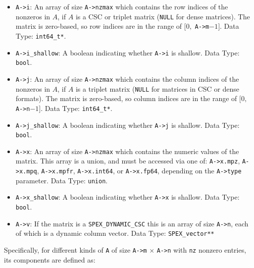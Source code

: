 \documentclass[12pt]{report}
\theoremstyle{definition}
\begin{document}
\begin{itemize}
\item \verb|A->i|: An array of size \verb|A->nzmax| which contains the row
indices of the nonzeros in $A$, if $A$ is a CSC or triplet matrix (\verb|NULL|
for dense matrices). The matrix is zero-based, so row indices are
in the range of $[0,$ \verb|A->m|$-1]$. Data Type: \verb|int64_t*|.

\item \verb|A->i_shallow|: A boolean indicating whether \verb|A->i| is shallow.
Data Type: \verb|bool|.

\item \verb|A->j|: An array of size \verb|A->nzmax| which contains the column
indices of the nonzeros in $A$, if $A$ is a triplet matrix (\verb|NULL| for
matrices in CSC or dense formats).
The matrix is zero-based, so column indices are
in the range of $[0,$ \verb|A->n|$-1]$. Data Type: \verb|int64_t*|.

\item \verb|A->j_shallow|: A boolean indicating whether \verb|A->j| is shallow.
Data Type: \verb|bool|.

\item \verb|A->x|: An array of size \verb|A->nzmax| which contains the
numeric values of the matrix.  This array is a union, and must be accessed via
one of: \verb|A->x.mpz|, \verb|A->x.mpq|, \verb|A->x.mpfr|, \verb|A->x.int64|,
or \verb|A->x.fp64|, depending on the \verb|A->type| parameter.
Data Type: \verb|union|.

\item \verb|A->x_shallow|: A boolean indicating whether \verb|A->x| is
shallow. Data Type: \verb|bool|.

\item \verb|A->v|: If the matrix is a \verb|SPEX_DYNAMIC_CSC| this is an array of size \verb|A->n|, each of which is a dynamic column vector. Data Type: \verb|SPEX_vector**|
\end{itemize}

Specifically, for different kinds of \verb|A| of size \verb|A->m| $\times$ \verb|A->n|
with \verb|nz| nonzero entries, its components are defined as:
\end{document}
